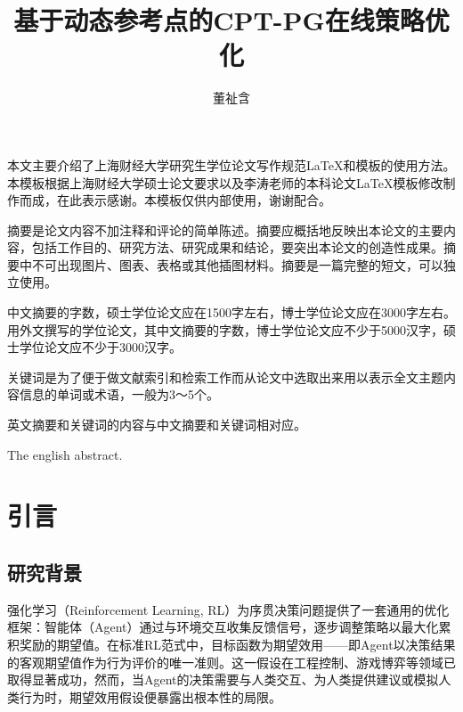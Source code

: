 \documentclass{sufethesismas}
\begin{document}
\classification{}
\confidential{}
\UDC{}
\serialnumber{}
\title{基于动态参考点的CPT-PG在线策略优化}
\author{董祉含}


\maketitle

\frontmatter
\begin{abstractCN}
本文主要介绍了上海财经大学研究生学位论文写作规范\LaTeX 和模板的使用方法。本模板根据上海财经大学硕士论文要求以及李涛老师的本科论文\LaTeX 模板修改制作而成，在此表示感谢。本模板仅供内部使用，谢谢配合。

摘要是论文内容不加注释和评论的简单陈述。摘要应概括地反映出本论文的主要内容，包括工作目的、研究方法、研究成果和结论，要突出本论文的创造性成果。摘要中不可出现图片、图表、表格或其他插图材料。摘要是一篇完整的短文，可以独立使用。

中文摘要的字数，硕士学位论文应在1500字左右，博士学位论文应在3000字左右。用外文撰写的学位论文，其中文摘要的字数，博士学位论文应不少于5000汉字，硕士学位论文应不少于3000汉字。

关键词是为了便于做文献索引和检索工作而从论文中选取出来用以表示全文主题内容信息的单词或术语，一般为3～5个。

英文摘要和关键词的内容与中文摘要和关键词相对应。
\end{abstractCN}

\begin{abstractEN}
The english abstract.
\end{abstractEN}


\tableofcontents{}

\mainmatter


\chapter{引言}
\section{研究背景}
强化学习（Reinforcement Learning, RL）为序贯决策问题提供了一套通用的优化框架：智能体（Agent）通过与环境交互收集反馈信号，逐步调整策略以最大化累积奖励的期望值。在标准RL范式中，目标函数为期望效用——即Agent以决策结果的客观期望值作为行为评价的唯一准则。这一假设在工程控制、游戏博弈等领域已取得显著成功，然而，当Agent的决策需要与人类交互、为人类提供建议或模拟人类行为时，期望效用假设便暴露出根本性的局限。
\end{document}
